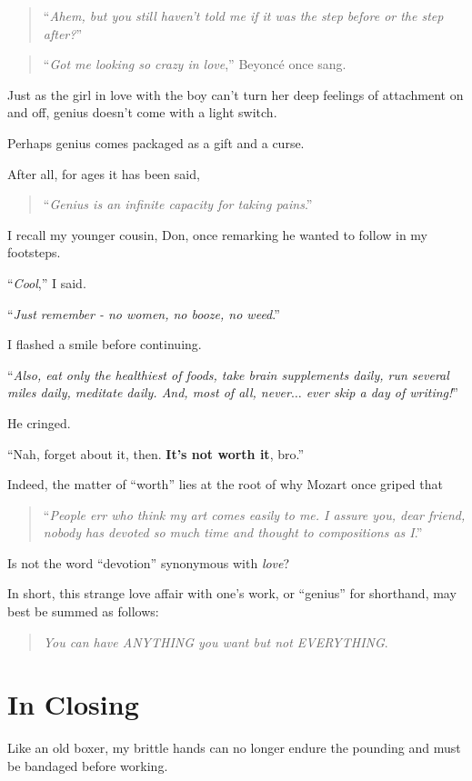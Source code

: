 \documentclass{book}
\numberwithin{equation}{section}
\begin{document}
\begin{quotation}
    ``\textit{Ahem, but you still haven't told me if it was the step before or the step after?}''
\end{quotation}

\begin{quotation}
    ``\textit{Got me looking so crazy in love},'' Beyoncé once sang.
\end{quotation}
Just as the girl in love with the boy can't turn her deep feelings of attachment on and off, genius doesn't come with a light switch.

%
Perhaps genius comes packaged as a gift and a curse.

After all, for ages it has been said,
\begin{quotation}
    ``\textit{Genius is an infinite capacity for taking pains}.''
\end{quotation}
I recall my younger cousin, Don, once remarking he wanted to follow in my footsteps.

%
``\textit{Cool},'' I said.

``\textit{Just remember - no women, no booze, no weed}.''

I flashed a smile before continuing.

``\textit{Also, eat only the healthiest of foods, take brain supplements daily, run several miles daily, meditate daily. And, most of all, never$\ldots$ ever skip a day of writing!}''

%
He cringed.

``Nah, forget about it, then. \textbf{It's not worth it}, bro.''

%
Indeed, the matter of ``worth'' lies at the root of why Mozart once griped that

\begin{quotation}
    ``\textit{People err who think my art comes easily to me. I assure you, dear friend, nobody has devoted so much time and thought to compositions as I}.''
\end{quotation}
Is not the word ``devotion'' synonymous with \textit{love}?

%
In short, this strange love affair with one's work, or ``genius'' for shorthand, may best be summed as follows:

\begin{quotation}
    \textit{You can have ANYTHING you want but not EVERYTHING}.
\end{quotation}

\section{In Closing}
\textsf{Like an old boxer, my brittle hands can no longer endure the pounding and must be bandaged before working.}
\end{document}
